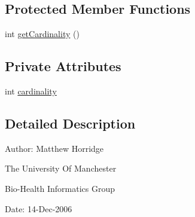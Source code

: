 \subsection*{Protected Member Functions}
\begin{DoxyCompactItemize}
\item 
int \hyperlink{classorg_1_1coode_1_1owlapi_1_1owlxmlparser_1_1_abstract_data_cardinality_restriction_element_handler_a21ec93d97121587557563e06f22311be}{get\-Cardinality} ()
\end{DoxyCompactItemize}
\subsection*{Private Attributes}
\begin{DoxyCompactItemize}
\item 
int \hyperlink{classorg_1_1coode_1_1owlapi_1_1owlxmlparser_1_1_abstract_data_cardinality_restriction_element_handler_a3694efaae574375494028ca24b25e1b3}{cardinality}
\end{DoxyCompactItemize}


\subsection{Detailed Description}
Author\-: Matthew Horridge\par
 The University Of Manchester\par
 Bio-\/\-Health Informatics Group\par
 Date\-: 14-\/\-Dec-\/2006\par
\par
 

